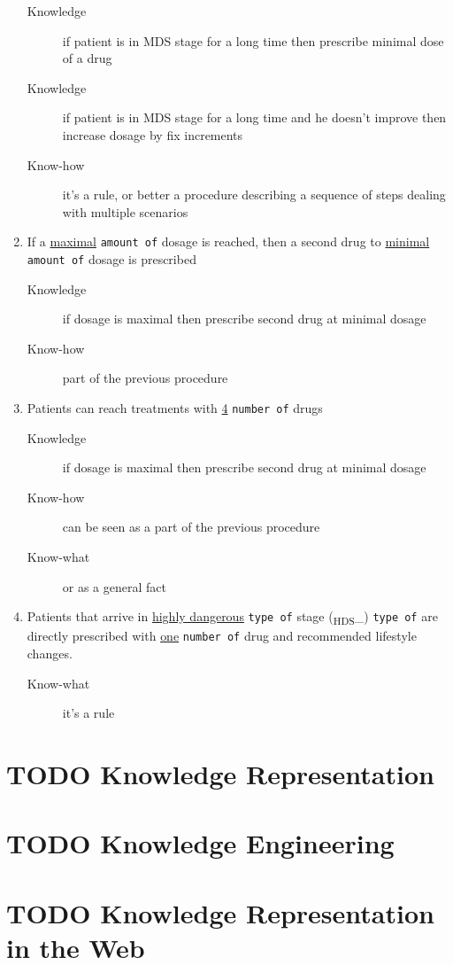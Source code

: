 \documentclass[a4paper,10pt,twoside,twocolumn]{article}
\begin{document}
\begin{enumerate}
\begin{description}
\item[{Knowledge}] if patient is in MDS stage for a long time then prescribe minimal dose of a drug
\item[{Knowledge}] if patient is in MDS stage for a long time and he doesn't improve then increase dosage by fix increments
\item[{Know-how}] it's a rule, or better a procedure describing a sequence of steps dealing with multiple scenarios
\end{description}
\item If a \uline{maximal} \texttt{amount of} dosage is reached, then a second drug to \uline{minimal} \texttt{amount of} dosage is prescribed
\begin{description}
\item[{Knowledge}] if dosage is maximal then prescribe second drug at minimal dosage
\item[{Know-how}] part of the previous procedure
\end{description}
\item Patients can reach treatments with \uline{4} \texttt{number of} drugs
\begin{description}
\item[{Knowledge}] if dosage is maximal then prescribe second drug at minimal dosage
\item[{Know-how}] can be seen as a part of the previous procedure
\item[{Know-what}] or as a general fact
\end{description}
\item Patients that arrive in \uline{highly dangerous} \texttt{type of} stage (\textsubscript{HDS}\_) \texttt{type of} are directly prescribed with \uline{one} \texttt{number of} drug and recommended lifestyle changes.
\begin{description}
\item[{Know-what}] it's a rule
\end{description}
\end{enumerate}
\section{{\bfseries\sffamily TODO} Knowledge Representation}
\label{sec:org8eb6977}
\section{{\bfseries\sffamily TODO} Knowledge Engineering}
\label{sec:org2dd12f9}
\section{{\bfseries\sffamily TODO} Knowledge Representation in the Web}
\label{sec:orgd43ec9a}
\end{document}
